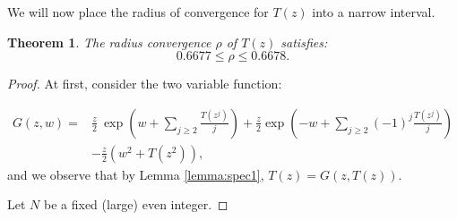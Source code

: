 \documentclass{amsart}
\theoremstyle{plain}
\newtheorem{theorem}{Theorem}
\newcommand{\nicetrees}{T}
\begin{document}

We will now place  the radius of
convergence for $\nicetrees(z)$ into a narrow interval.


\begin{theorem}\label{thm:boundstoradius}
The radius convergence $\rho$ of  $T(z)$ satisfies: 
\begin{equation*}
    0.6677 \leq \rho \leq 0.6678.
\end{equation*}
\end{theorem}
\begin{proof}


At first, consider the two variable function:

\begin{align}\label{eq:G}
\nonumber G(z,w) =   &\frac{z}{2} 
\ \exp\left( w + \sum\limits_{j \geq 2} \frac{\nicetrees(z^j)}{j}\right) 
+ \frac{z}{2}\exp\left(-w + \sum\limits_{j \geq 2} (-1)^j \frac{\nicetrees(z^j)}{j}\right) \\ &
- \frac{z}{2}\left({w^2}
+ {\nicetrees(z^2)} \right),
\end{align}
and we observe that by Lemma \ref{lemma:spec1}, $T(z) = G(z,T(z))$.

Let $N$ be a fixed (large) even integer.


\end{proof}
\end{document}
